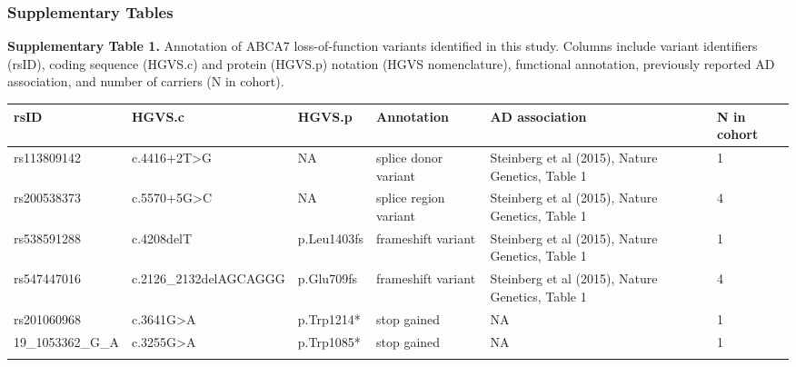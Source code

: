 \subsubsection*{Supplementary Tables}

\captionsetup{justification=raggedright,singlelinecheck=false}
\renewcommand{\thetable}{S\arabic{table}}
\setcounter{table}{0}  

\renewcommand{\arraystretch}{1.2} 

\clearpage
\textbf{Supplementary Table 1.} Annotation of ABCA7 loss-of-function variants identified in this study. Columns include variant identifiers (rsID), coding sequence (HGVS.c) and protein (HGVS.p) notation (HGVS nomenclature), functional annotation, previously reported AD association, and number of carriers (N in cohort).

\begin{longtable}{p{3.5cm} p{4.7cm} p{3cm} p{2.5cm} p{2.3cm} p{1cm}}
    \hline
    \textbf{rsID}          & \textbf{HGVS.c}           & \textbf{HGVS.p}    & \textbf{Annotation}                                                           & \textbf{AD association}                                                                   & \textbf{N in cohort} \\
    \hline
    \hline
    rs113809142            & c.4416+2T>G               & NA                 & splice donor variant \supercite{Allen2017-on}                                      & Steinberg et al (2015), Nature Genetics, Table 1 \supercite{Steinberg2015-vj}                   & 1 \\
    \hline
    rs200538373            & c.5570+5G>C               & NA                 & splice region variant \supercite{Allen2017-on,Steinberg2015-vj}                    & Steinberg et al (2015), Nature Genetics, Table 1 \supercite{Steinberg2015-vj}                   & 4 \\
    \hline
    rs538591288            & c.4208delT                & p.Leu1403fs        & frameshift variant \supercite{Allen2017-on}                                        & Steinberg et al (2015), Nature Genetics, Table 1 \supercite{Steinberg2015-vj}                   & 1 \\
    \hline
    rs547447016            & c.2126\_2132delAGCAGGG    & p.Glu709fs         & frameshift variant \supercite{Allen2017-on}                                        & Steinberg et al (2015), Nature Genetics, Table 1 \supercite{Steinberg2015-vj}                   & 4 \\
    \hline
    rs201060968            & c.3641G>A                & p.Trp1214*         & stop gained                                                                   & NA                                                                                        & 1 \\
    \hline
    19\_1053362\_G\_A       & c.3255G>A                & p.Trp1085*         & stop gained                                                                   & NA                                                                                        & 1 \\
    \hline
    \label{tab:annotation_abca7}
\end{longtable}

